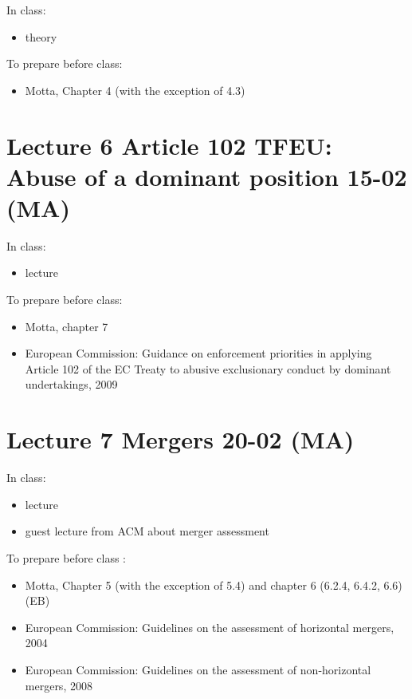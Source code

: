 \documentclass[]{book}
\providecommand{\tightlist}{%
  \setlength{\itemsep}{0pt}\setlength{\parskip}{0pt}}
\begin{document}
In class:

\begin{itemize}
\tightlist
\item
  theory
\end{itemize}

To prepare before class:

\begin{itemize}
\tightlist
\item
  Motta, Chapter 4 (with the exception of 4.3)
\end{itemize}

\section{Lecture 6 Article 102 TFEU: Abuse of a dominant position 15-02
(MA)}\label{lecture-6-article-102-tfeu-abuse-of-a-dominant-position-15-02-ma}

In class:

\begin{itemize}
\tightlist
\item
  lecture
\end{itemize}

To prepare before class:

\begin{itemize}
\tightlist
\item
  Motta, chapter 7
\item
  European Commission: Guidance on enforcement priorities in applying
  Article 102 of the EC Treaty to abusive exclusionary conduct by
  dominant undertakings, 2009
\end{itemize}

\section{Lecture 7 Mergers 20-02 (MA)}\label{lecture-7-mergers-20-02-ma}

In class:

\begin{itemize}
\tightlist
\item
  lecture
\item
  guest lecture from ACM about merger assessment
\end{itemize}

To prepare before class :

\begin{itemize}
\tightlist
\item
  Motta, Chapter 5 (with the exception of 5.4) and chapter 6 (6.2.4,
  6.4.2, 6.6) (EB)
\item
  European Commission: Guidelines on the assessment of horizontal
  mergers, 2004
\item
  European Commission: Guidelines on the assessment of non-horizontal
  mergers, 2008
\end{itemize}
\end{document}
